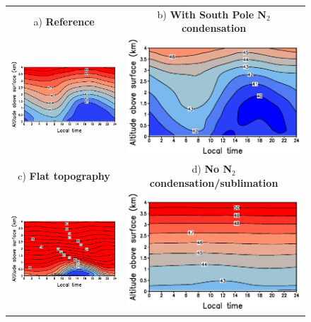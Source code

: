 \begin{figure}
  \begin{center}
\renewcommand{\arraystretch}{0.2}
\begin{tabular}[h]{cc}
\hspace{-2.cm}
 a) {\bf Reference} & b) {\bf With South Pole N$_2$ condensation} \\
\hspace{-2.cm}
   \includegraphics[width=8.cm,angle=-0,clip]{figures/diuT.eps} &
   \includegraphics[width=8.cm,angle=-0,clip]{figures/diuT_pole.eps} \\
\hspace{-2.cm}
c) {\bf Flat topography} & 
d) {\bf No N$_2$ condensation/sublimation} \\
\hspace{-2.cm}
   \includegraphics[width=8.cm,angle=-0,clip]{figures/diuT_flat.eps} &
   \includegraphics[width=8.cm,angle=-0,clip]{figures/diuT_nocon.eps} \\ 

\end{tabular}
\end{center}
\end{figure}
